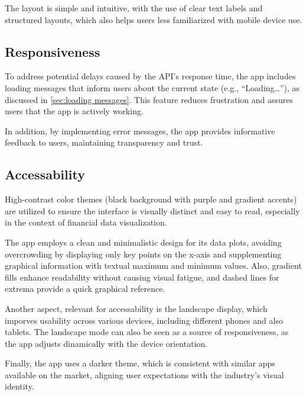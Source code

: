 \documentclass{article}
\begin{document}
The layout is simple and intuitive, with the use of clear text labels and structured layouts, which also helps users less familiarized with mobile device use.

\subsection{Responsiveness}
To address potential delays caused by the API’s response time, the app includes loading messages that inform users about the current state (e.g., “Loading…”), as discussed in \autoref{sec:loading messages}. 
This feature reduces frustration and assures users that the app is actively working.

In addition, by implementing error messages, the app provides informative feedback to users, maintaining transparency and trust.
    

\subsection{Accessability}
High-contrast color themes (black background with purple and gradient accents) are utilized to ensure the interface is visually distinct and easy to read, especially in the context of financial data visualization.

The app employs a clean and minimalistic design for its data plots, avoiding overcrowding by displaying only key points on the x-axis and supplementing graphical information with textual maximum and minimum values.
Also, gradient fills enhance readability without causing visual fatigue, and dashed lines for extrema provide a quick graphical reference.

Another aspect, relevant for accessability is the landscape display, which imporves usability across various devices, including different phones and also tablets.
The landscape mode can also be seen as a source of responsiveness, as the app adjusts dinamically with the device orientation.

Finally, the app uses a darker theme, which is consistent with similar apps available on the market, aligning user expectations with the industry's visual identity.



\end{document}
